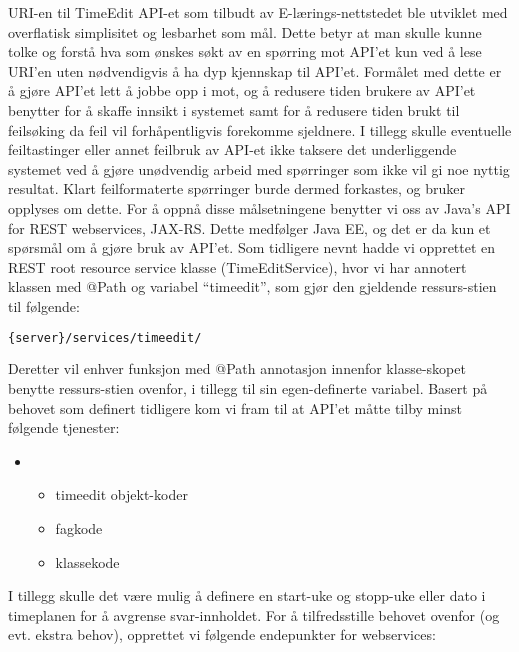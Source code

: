 \documentclass[../main.tex]{subfiles}
\begin{document}
URI-en til TimeEdit API-et som tilbudt av E-lærings-nettstedet ble utviklet med overflatisk simplisitet og lesbarhet som mål. Dette betyr at man skulle kunne tolke og forstå hva som ønskes søkt av en spørring mot API’et kun ved å lese URI’en uten nødvendigvis å ha dyp kjennskap til API’et. Formålet med dette er å gjøre API’et lett å jobbe opp i mot, og å redusere tiden brukere av API’et benytter for å skaffe innsikt i systemet samt for å redusere tiden brukt til feilsøking da feil vil forhåpentligvis forekomme sjeldnere.\newline
I tillegg skulle eventuelle feiltastinger eller annet feilbruk av API-et ikke taksere det underliggende systemet ved å gjøre unødvendig arbeid med spørringer som ikke vil gi noe nyttig resultat. Klart feilformaterte spørringer burde dermed forkastes, og bruker opplyses om dette.\newline
\newline
For å oppnå disse målsetningene benytter vi oss av Java’s API for REST webservices, JAX-RS. Dette medfølger Java EE, og det er da kun et spørsmål om å gjøre bruk av API’et.
Som tidligere nevnt hadde vi opprettet en REST root resource service klasse (TimeEditService), hvor vi har annotert klassen med @Path og variabel “timeedit”, som gjør den gjeldende ressurs-stien til følgende:

\begin{lstlisting}[language=HTML, frame=single, caption={asdasdsadasdasdasdsadsadasdasdsadsa}]
{server}/services/timeedit/
\end{lstlisting}

Deretter vil enhver funksjon med @Path annotasjon innenfor klasse-skopet benytte ressurs-stien ovenfor, i tillegg til sin egen-definerte variabel.
Basert på behovet som definert tidligere kom vi fram til at API’et måtte tilby minst følgende tjenester:

\begin{itemize}
\item
\begin{itemize}
\item timeedit objekt-koder
\item fagkode
\item klassekode
\end{itemize}
\end{itemize}

I tillegg skulle det være mulig å definere en start-uke og stopp-uke eller dato i timeplanen for å avgrense svar-innholdet.\newline
For å tilfredsstille behovet ovenfor (og evt. ekstra behov), opprettet vi følgende endepunkter for webservices:
\end{document}

